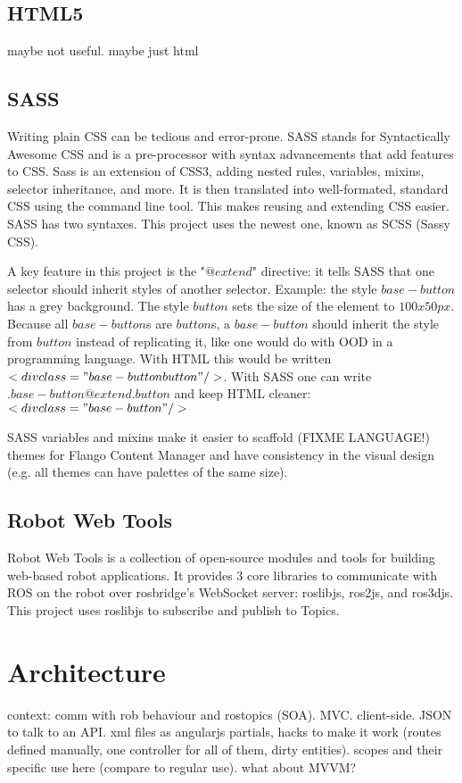     
\subsection{HTML5}
maybe not useful. maybe just html

\subsection{SASS}
Writing plain \ac{CSS} can be tedious and error-prone.
SASS stands for Syntactically Awesome CSS and is a pre-processor with syntax advancements that add features to \ac{CSS}.
Sass is an extension of \ac{CSS}3, adding nested rules, variables, mixins, selector inheritance, and more.
It is then translated into well-formated, standard \ac{CSS} using the command line tool.
This makes reusing and extending \ac{CSS} easier.
SASS has two syntaxes. This project uses the newest one, known as \ac{SCSS} (Sassy CSS).

A key feature in this project is the "$@extend$" directive: it tells SASS that one selector should inherit styles of another selector.
Example: the style $base-button$ has a grey background. The style $button$ sets the size of the element to $100 x 50 px$.
Because all $base-button$s are $button$s, a $base-button$ should inherit the style from $button$ instead of replicating it, like one would do with \ac{OOD} in a programming language.
With \ac{HTML} this would be written $<div class="base-button button" />$.
With SASS one can write $.base-button { @extend .button }$ and keep \ac{HTML} cleaner: $<div class="base-button" />$

SASS variables and mixins make it easier to scaffold (FIXME LANGUAGE!) themes for Flango Content Manager and have consistency in the visual design (e.g. all themes can have palettes of the same size).

\subsection{Robot Web Tools}
Robot Web Tools is a collection of open-source modules and tools for building web-based robot applications.
It provides 3 core libraries to communicate with \ac{ROS} on the robot over rosbridge's WebSocket server: roslibjs, ros2js, and ros3djs.
This project uses roslibjs to subscribe and publish to Topics.

\section{Architecture}
context: comm with rob behaviour and rostopics (SOA).
MVC. client-side. JSON to talk to an API. xml files as angularjs partials, hacks to make it work (routes defined manually, one controller for all of them, dirty entities). scopes and their specific use here (compare to regular use). what about MVVM?

